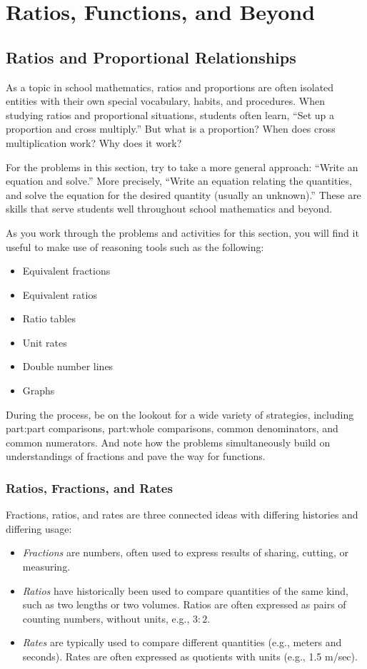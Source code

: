\chapter{Ratios, Functions, and Beyond}

\section{Ratios and Proportional Relationships}
As a topic in school mathematics, ratios and proportions are often isolated entities with their own special vocabulary, habits, and procedures.  When studying ratios and proportional situations, students often learn, ``Set up a proportion and cross multiply.''   But what is a proportion?  When does cross multiplication work?  Why does it work?  

For the problems in this section, try to take a more general approach:  ``Write an equation and solve.''  More precisely, ``Write an equation relating the quantities, and solve the equation for the desired quantity (usually an unknown).''  These are skills that serve students well throughout school mathematics and beyond.  

As you work through the problems and activities for this section, you will find it useful to make use of reasoning tools such as the following:  
\begin{itemize}
\item Equivalent fractions
\item Equivalent ratios
\item Ratio tables
\item Unit rates
\item Double number lines
\item Graphs
\end{itemize}

During the process, be on the lookout for a wide variety of strategies, including part:part comparisons, part:whole comparisons, common denominators, and common numerators.  And note how the problems simultaneously build on understandings of fractions and pave the way for functions.  

\subsection{Ratios, Fractions, and Rates}
Fractions, ratios, and rates are three connected ideas with differing histories and differing usage: 
\begin{itemize} 
\item \emph{Fractions} are numbers, often used to express results of sharing, cutting, or measuring.  
\item \emph{Ratios} have historically been used to compare quantities of the same kind, such as two lengths or two volumes.  Ratios are often expressed as pairs of counting numbers, without units, e.g., $3:2$.  
\item \emph{Rates} are typically used to compare different quantities (e.g., meters and seconds).  Rates are often expressed as quotients with units (e.g., 1.5 m/sec).  
\end{itemize} 

